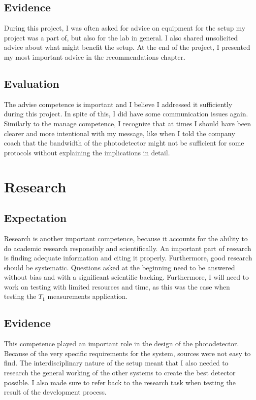 \documentclass{report}
\begin{document}
\subsection{Evidence}
During this project, I was often asked for advice on equipment for the setup my project was a part of, but also for the lab in general. I also shared unsolicited advice about what might benefit the setup. At the end of the project, I presented my most important advice in the recommendations chapter.

\subsection{Evaluation}
The advise competence is important and I believe I addressed it sufficiently during this project. In spite of this, I did have some communication issues again. Similarly to the manage competence, I recognize that at times I should have been clearer and more intentional with my message, like when I told the company coach that the bandwidth of the photodetector might not be sufficient for some protocols without explaining the implications in detail.

\section{Research}\label{chap:research}
\subsection{Expectation}
Research is another important competence, because it accounts for the ability to do academic research responsibly and scientifically. An important part of research is finding adequate information and citing it properly. Furthermore, good research should be systematic. Questions asked at the beginning need to be answered without bias and with a significant scientific backing. Furthermore, I will need to work on testing with limited resources and time, as this was the case when testing the $T_1$ measurements application.

\subsection{Evidence}
This competence played an important role in the design of the photodetector. Because of the very specific requirements for the system, sources were not easy to find. The interdisciplinary nature of the setup meant that I also needed to research the general working of the other systems to create the best detector possible. I also made sure to refer back to the research task when testing the result of the development process.
\end{document}
